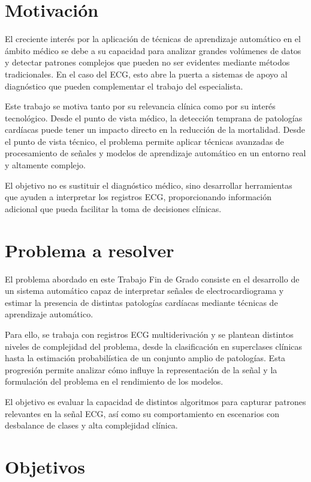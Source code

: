 \documentclass[12pt,a4paper,twoside]{book}
\begin{document}
\section{Motivación}

El creciente interés por la aplicación de técnicas de aprendizaje automático en el ámbito médico se debe a su capacidad para analizar grandes volúmenes de datos y detectar patrones complejos que pueden no ser evidentes mediante métodos tradicionales. 
En el caso del ECG, esto abre la puerta a sistemas de apoyo al diagnóstico que pueden complementar el trabajo del especialista.

Este trabajo se motiva tanto por su relevancia clínica como por su interés tecnológico. 
Desde el punto de vista médico, la detección temprana de patologías cardíacas puede tener un impacto directo en la reducción de la mortalidad. 
Desde el punto de vista técnico, el problema permite aplicar técnicas avanzadas de procesamiento de señales y modelos de aprendizaje automático en un entorno real y altamente complejo.

El objetivo no es sustituir el diagnóstico médico, sino desarrollar herramientas que ayuden a interpretar los registros ECG, proporcionando información adicional que pueda facilitar la toma de decisiones clínicas.

\section{Problema a resolver}

El problema abordado en este Trabajo Fin de Grado consiste en el desarrollo de un sistema automático capaz de interpretar señales de electrocardiograma y estimar la presencia de distintas patologías cardíacas mediante técnicas de aprendizaje automático.

Para ello, se trabaja con registros ECG multiderivación y se plantean distintos niveles de complejidad del problema, desde la clasificación en superclases clínicas hasta la estimación probabilística de un conjunto amplio de patologías. 
Esta progresión permite analizar cómo influye la representación de la señal y la formulación del problema en el rendimiento de los modelos.

El objetivo es evaluar la capacidad de distintos algoritmos para capturar patrones relevantes en la señal ECG, así como su comportamiento en escenarios con desbalance de clases y alta complejidad clínica.

\section{Objetivos}
\end{document}
